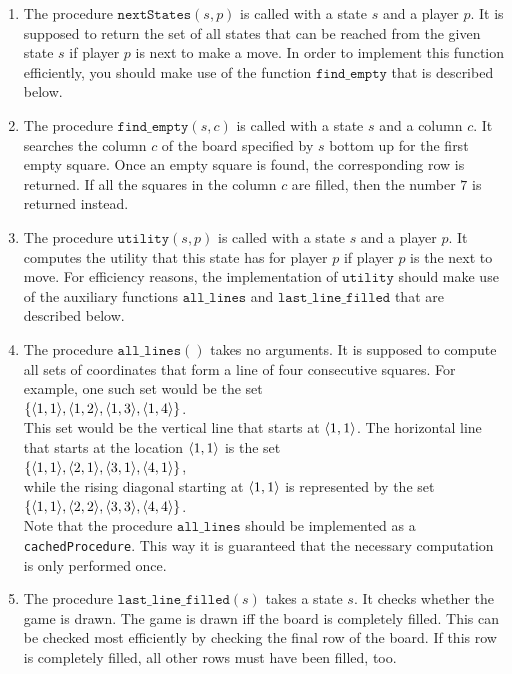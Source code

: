 \begin{enumerate}
\item The procedure $\texttt{nextStates}(s, p)$ is called with a state $s$ and a player $p$.
      It is supposed to return the set of all states that can be reached from the given state $s$ if player $p$
      is next to make a move.  In order to implement this function efficiently, you should make use of the
      function $\texttt{find\_empty}$ that is described below.  
\item The procedure $\texttt{find\_empty}(s, c)$ is called with a state $s$ and a column $c$.  It searches the
      column $c$ of the board specified by $s$ bottom up for the first empty square.  Once an empty square is found, 
      the corresponding row is returned.  If all the squares in the column $c$ are filled, then the number $7$
      is returned instead.
\item The procedure $\texttt{utility}(s, p)$ is called with a state $s$ and a player $p$.
      It computes the utility that this state has for player $p$ if player $p$ is the next to move.
      For efficiency reasons, the implementation of $\texttt{utility}$ should make use of the auxiliary functions
      $\texttt{all\_lines}$ and $\texttt{last\_line\_filled}$ that are described below.
\item The procedure $\texttt{all\_lines}()$ takes no arguments.  It is supposed to compute all sets of coordinates that form
      a line of four consecutive squares.  For example, one such set would be the set
      \\[0.2cm]
      \hspace*{1.3cm}
      $\{ \pair(1,1), \pair(1,2), \pair(1,3), \pair(1,4) \}$.
      \\[0.2cm]
      This set would be the vertical line that starts at $\pair(1,1)$.  The horizontal line that starts at the
      location  $\pair(1,1)$ is the set
      \\[0.2cm]
      \hspace*{1.3cm}
      $\{ \pair(1,1), \pair(2,1), \pair(3,1), \pair(4,1) \}$,
      \\[0.2cm]
      while the rising diagonal starting at $\pair(1,1)$ is represented by the set
      \\[0.2cm]
      \hspace*{1.3cm}
      $\{ \pair(1,1), \pair(2,2), \pair(3,3), \pair(4,4) \}$.
      \\[0.2cm]
      Note that the procedure $\texttt{all\_lines}$ should be implemented as a \texttt{cachedProcedure}.  This
      way it is guaranteed that the necessary computation is only performed once.
\item The procedure $\texttt{last\_line\_filled}(s)$ takes a state $s$.  It checks whether the game is drawn.
      The game is drawn iff the board is completely filled.  This can be checked most efficiently by checking
      the final row of the board.  If this row is completely filled, all other rows must have  been filled, too.
      \eox
\end{enumerate}


